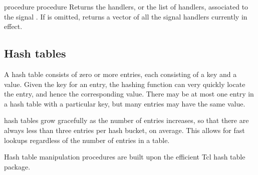 \begin{entry}{%
 {procedure}
 {procedure}}
\saut 
Returns the handlers, or the list of handlers, associated to the signal
.  If  is omitted,  returns
a vector of all the signal handlers currently in effect. 
\end{entry}



\subsection{Hash tables}

\label{hashtables}
A hash table consists of zero or more entries, each consisting of a key and a
value. Given the key for an entry, the hashing function can very quickly
locate the entry, and hence the corresponding value. There may be at most one
entry in a hash table with a particular key, but many entries may have the
same value.

{\stk} hash tables grow gracefully as the number of entries increases, so that
there are always less than three entries per hash bucket, on average.  This
allows for fast lookups regardless of the number of entries in a table.

\vskip3mm
\begin{note}
Hash table manipulation procedures are built upon the efficient Tcl hash
table package.
\end{note}

